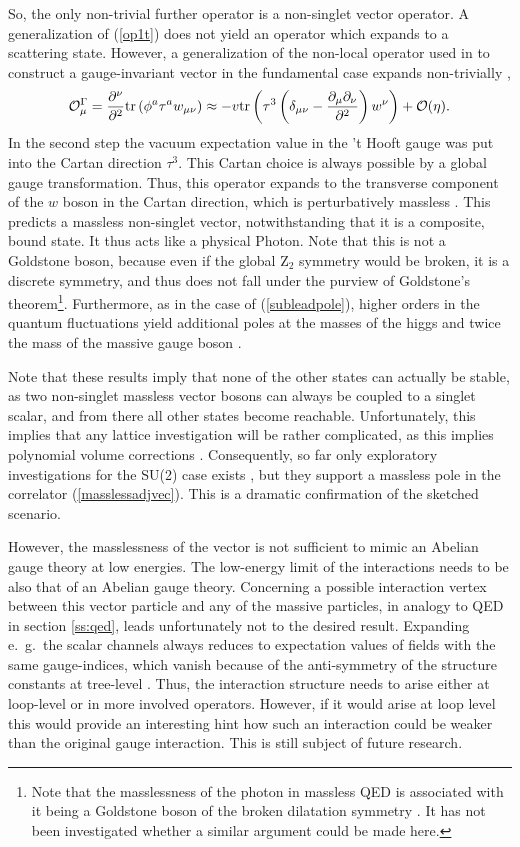 \documentclass[final,12pt,3p,longtitle]{elsarticle}
\newcommand*{\no}{\noindent}
\newcommand*{\be}{\begin{equation}}
\newcommand*{\ee}{\end{equation}}
\newcommand*{\pd}{\partial}
\newcommand*{\pdm}{\pd_{\mu}}
\newcommand*{\pdn}{\pd_{\nu}}
\newcommand*{\pref}[1]{(\ref{#1})}
\newcommand*{\mn}{{\mu\nu}}
\newcommand*{\tr}{\mathrm{tr}}
\newcommand*{\1}{1\!\!\!\bot}
\newcommand*{\op}{{\cal O}}
\begin{document}
So, the only non-trivial further operator is a non-singlet vector operator. A generalization of \pref{op1t} does not yield an operator which expands to a scattering state. However, a generalization of the non-local operator used in \cite{Frohlich:1981yi} to construct a gauge-invariant vector in the fundamental case expands non-trivially \cite{Maas:2017xzh},
\be
\op^\Gamma_\mu=\frac{\pd^\nu}{\pd^2}\tr\left(\phi^a\tau^aw_\mn\right)\approx-v\tr\left(\tau^3\left(\delta_\mn-\frac{\pdm\pdn}{\pd^2}\right)w^\nu\right)+\op(\eta)\label{masslessadjvec}.
\ee
\no In the second step the vacuum expectation value in the 't Hooft gauge was put into the Cartan direction $\tau^3$. This Cartan choice is always possible by a global gauge transformation. Thus, this operator expands to the transverse component of the $w$ boson in the Cartan direction, which is perturbatively massless \cite{Maas:2017xzh,O'Raifeartaigh:1986vq}. This predicts a massless non-singlet vector, notwithstanding that it is a composite, bound state. It thus acts like a physical Photon. Note that this is not a Goldstone boson, because even if the global Z$_2$ symmetry would be broken, it is a discrete symmetry, and thus does not fall under the purview of Goldstone's theorem\footnote{Note that the masslessness of the photon in massless QED is associated with it being a Goldstone boson of the broken dilatation symmetry \cite{Alkofer:2000wg,Lenz:1994tc}. It has not been investigated whether a similar argument could be made here.}. Furthermore, as in the case of \pref{subleadpole}, higher orders in the quantum fluctuations yield additional poles at the masses of the higgs and twice the mass of the massive gauge boson \cite{Maas:2017xzh}.

Note that these results imply that none of the other states can actually be stable, as two non-singlet massless vector bosons can always be coupled to a singlet scalar, and from there all other states become reachable. Unfortunately, this implies that any lattice investigation will be rather complicated, as this implies polynomial volume corrections \cite{Gattringer:2010zz,Luscher:1985dn}. Consequently, so far only exploratory investigations for the SU(2) case exists \cite{Lee:1985yi}, but they support a massless pole in the correlator \pref{masslessadjvec}. This is a dramatic confirmation of the sketched scenario.

However, the masslessness of the vector is not sufficient to mimic an Abelian gauge theory at low energies. The low-energy limit of the interactions needs to be also that of an Abelian gauge theory. Concerning a possible interaction vertex between this vector particle and any of the massive particles, in analogy to QED in section \ref{ss:qed}, leads unfortunately not to the desired result. Expanding e.\ g.\ the scalar channels always reduces to expectation values of fields with the same gauge-indices, which vanish because of the anti-symmetry of the structure constants at tree-level \cite{Sondenheimer:pc}. Thus, the interaction structure needs to arise either at loop-level or in more involved operators. However, if it would arise at loop level this would provide an interesting hint how such an interaction could be weaker than the original gauge interaction. This is still subject of future research.
\end{document}
